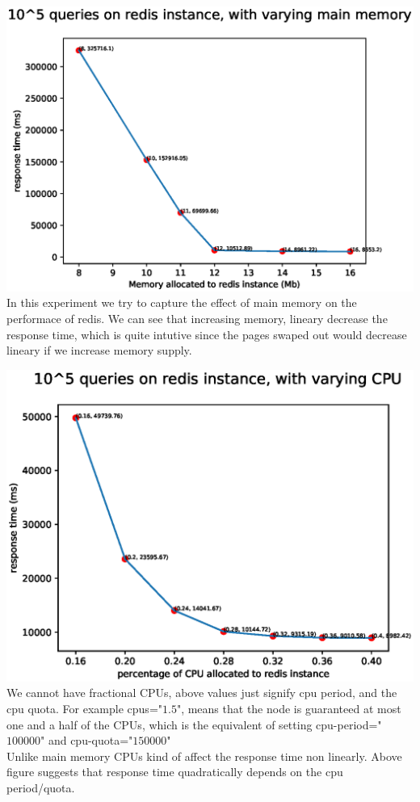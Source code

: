 \documentclass[11pt]{article}
\begin{document}
\includegraphics[width=\textwidth]{fig3.eps}
In this experiment we try to capture the effect of main memory on the performace
of redis. We can see that increasing memory, lineary decrease the response time,
which is quite intutive since the pages swaped out would decrease lineary 
if we increase memory supply.

\includegraphics[width=\textwidth]{fig4.eps}
We cannot have fractional CPUs, above values just signify cpu period,
and the cpu quota. For example cpus="$1.5$", means that the node is
guaranteed at most one and a half of the CPUs, which is the equivalent
of setting cpu-period="$100000$" and cpu-quota="$150000$"
\\

Unlike main memory CPUs kind of affect the response time non linearly.
Above figure suggests that response time quadratically depends on the 
cpu period/quota.
\end{document}
